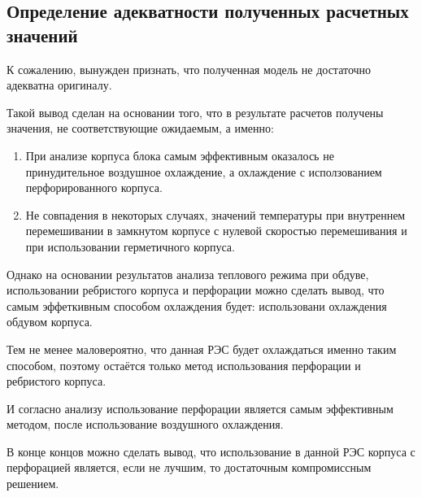 \subsection{Определение адекватности полученных расчетных значений}

К сожалению, вынужден признать, что полученная модель
не достаточно адекватна оригиналу.

Такой вывод сделан на основании того, что в результате расчетов
получены значения, не соответствующие ожидаемым, а именно:

\begin{enumerate}[label={\arabic*.}]
\item При анализе корпуса блока самым эффективным оказалось
  не принудительное воздушное охлаждение,
  а охлаждение с исползованием перфорированного корпуса.
  
\item Не совпадения в некоторых случаях, значений
  температуры при внутреннем перемешивании в замкнутом корпусе
  с нулевой скоростью перемешивания и при использовании герметичного корпуса.
  
\end{enumerate}

Однако на основании результатов анализа теплового режима при обдуве,
использовании ребристого корпуса и перфорации можно сделать вывод,
что самым эффеткивным способом охлаждения будет:
использовани охлаждения обдувом корпуса.

Тем не менее маловероятно,
что данная РЭС будет охлаждаться именно таким способом,
поэтому остаётся только метод использования перфорации и ребристого корпуса.

И согласно анализу использование перфорации является самым
эффективным методом, после использование воздушного охлаждения.

В конце концов можно сделать вывод, что
использование в данной РЭС корпуса с перфорацией является,
если не лучшим, то достаточным компромиссным решением.

\newpage %